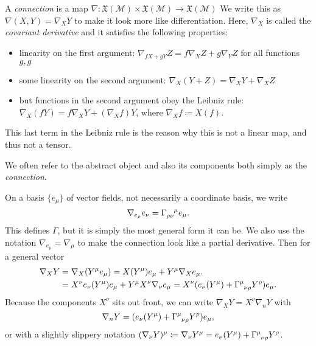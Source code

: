 \begin{definition}
  A \emph{connection} is a map $\nabla \colon \mathfrak{X}(\mathcal{M}) \times \mathfrak{X}(\mathcal{M}) \to \mathfrak{X}(\mathcal{M})$
  We write this as $\nabla(X, Y) = \nabla_X Y$ to make it look more like differentiation.
  Here, $\nabla_X$ is called the \emph{covariant derivative} and it satisfies the following properties:
  \begin{itemize}
    \item linearity on the first argument: $\nabla_{fX + gY} Z = f\nabla_X Z + g \nabla_Y Z $ for all functions $g, g$
    \item some linearity on the second argument: $\nabla_X (Y + Z) = \nabla_X Y + \nabla_X Z$
    \item but functions in the second argument obey the Leibniz rule: $\nabla_X (f Y) = f\nabla_X Y + (\nabla_X f) Y$, where $\nabla_X f \coloneqq X(f)$.
  \end{itemize}
\end{definition}
\begin{leftbar}
  \begin{remark}
    This last term in the Leibniz rule is the reason why this is not a linear map, and thus not a tensor.
  \end{remark}
\end{leftbar}
\begin{leftbar}
  \begin{remark}
    We often refer to the abstract object and also its components both simply as the \emph{connection}.
  \end{remark}
\end{leftbar}
On a basis $\{ e_\mu\}$ of vector fields, not necessarily a coordinate basis, we write
\begin{equation}
  \nabla_{e_\rho} e_\nu = \Gamma \indices{_{\rho\nu}^{\mu}} e_{\mu}.
\end{equation}
This defines $\Gamma$, but it is simply the most general form it can be.
We also use the notation $\nabla_{e_\mu} = \nabla_\mu$ to make the connection look like a partial derivative.
Then for a general vector
\begin{align}
  \nabla_X Y &= \nabla_X (Y^\mu e_\mu) = X (Y^\mu) e_\mu + Y^\mu \nabla_X e_\mu. \\
	     &= X^\nu e_\nu (Y^\mu) e_\mu + Y^\mu X^\nu \nabla_\nu e_\mu = X^\nu (e_\nu (Y^\mu) + \Gamma \indices{^\mu_\nu_\rho} Y^\rho) e_\mu.
\end{align}
Because the components $X^\nu$ sits out front, we can write $\nabla_X Y = X^\nu \nabla_n Y$ with 
\begin{equation}
  \nabla_n Y = (e_\nu (Y^\mu) + \Gamma \indices{^\mu_{\nu\rho}} Y^\rho) e_\mu,
\end{equation}
or with a slightly slippery notation $(\nabla_\nu Y)^\mu \coloneqq \nabla_\nu Y^\mu = e_\nu (Y^\mu) + \Gamma \indices{^\mu_\nu_\rho} Y^\rho$.

